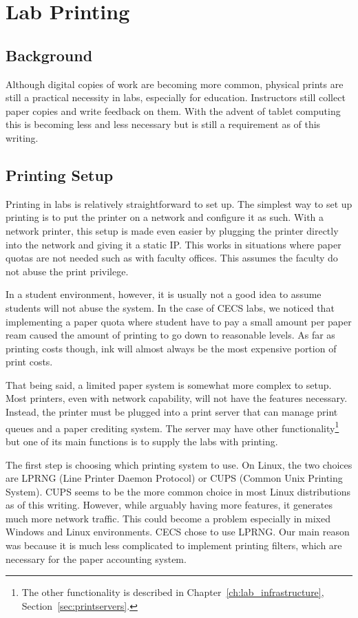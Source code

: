 \section{Lab Printing} \label{sec:lab_printing}
\subsection{Background}
Although digital copies of work are becoming more common, physical prints are still a practical necessity in labs, especially for education.  Instructors still collect paper copies and write feedback on them.  With the advent of tablet computing this is becoming less and less necessary but is still a requirement as of this writing.  

\subsection{Printing Setup}
Printing in labs is relatively straightforward to set up.  The simplest way to set up printing is to put the printer on a network and configure it as such.  With a network printer, this setup is made even easier by plugging the printer directly into the network and giving it a static IP.  This works in situations where paper quotas are not needed such as with faculty offices.  This assumes the faculty do not abuse the print privilege.  

In a student environment, however, it is usually not a good idea to assume students will not abuse the system.  In the case of CECS labs, we noticed that implementing a paper quota where student have to pay a small amount per paper ream caused the amount of printing to go down to reasonable levels.  As far as printing costs though, ink will almost always be the most expensive portion of print costs.  

That being said, a limited paper system is somewhat more complex to setup.  Most printers, even with network capability, will not have the features necessary.  Instead, the printer must be plugged into a print server that can manage print queues and a paper crediting system.  The server may have other functionality\footnote{The other functionality is described in Chapter~\ref{ch:lab_infrastructure}, Section~\ref{sec:printservers}.} but one of its main functions is to supply the labs with printing.  

The first step is choosing which printing system to use.  On Linux, the two choices are LPRNG (Line Printer Daemon Protocol) or CUPS (Common Unix Printing System).  CUPS seems to be the more common choice in most Linux distributions as of this writing.  However, while arguably having more features, it generates much more network traffic.  This could become a problem especially in mixed Windows and Linux environments.  CECS chose to use LPRNG.  Our main reason was because it is much less complicated to implement printing filters, which are necessary for the paper accounting system.

